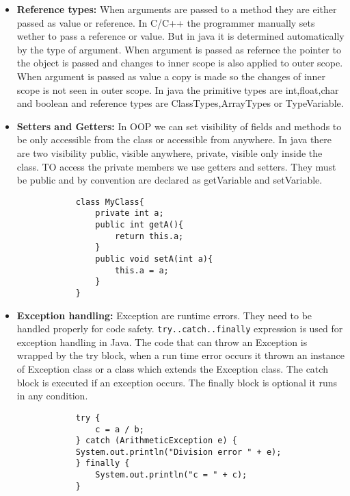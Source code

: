 \documentclass{book}
\begin{document}
\begin{itemize}
\begin{enumerate}
\begin{verbatim}
                        }
                    }
                \end{verbatim}
            \end{enumerate}
    \item{\textbf{Reference types:}}
        When arguments are passed to a method they are either passed as value or reference. In C/C++ the programmer manually sets wether to pass a reference or value.
        But in java it is determined automatically by the type of argument. When argument is passed as refernce the pointer to the object is passed and changes to inner scope is also applied to outer scope.
        When argument is passed as value a copy is made so the changes of inner scope is not seen in outer scope. In java the primitive types are int,float,char and boolean and reference types are ClassTypes,ArrayTypes or TypeVariable. 
    \item{\textbf{Setters and Getters:}}
        In OOP we can set visibility of fields and methods to be only accessible from the class or accessible from anywhere. In java there are two visibility public, visible anywhere, private, visible only inside the class.
        TO access the private members we use getters and setters. They must be public and by convention are declared as getVariable and setVariable.
        \begin{verbatim}
            class MyClass{
                private int a;
                public int getA(){
                    return this.a;
                }
                public void setA(int a){
                    this.a = a;
                }
            }
        \end{verbatim}
    \item{\textbf{Exception handling:}}
        Exception are runtime errors. They need to be handled properly for code safety. \verb|try..catch..finally| expression is used for exception handling in Java.
        The code that can throw an Exception is wrapped by the try block, when a run time error occurs it thrown an instance of Exception class or a class which extends the Exception class.
        The catch block is executed if an exception occurs. The finally block is optional it runs in any condition.
        \begin{verbatim}
            try {
                c = a / b;
            } catch (ArithmeticException e) {
            System.out.println("Division error " + e);
            } finally {
                System.out.println("c = " + c);
            }
        \end{verbatim}
\end{itemize}
\end{document}
